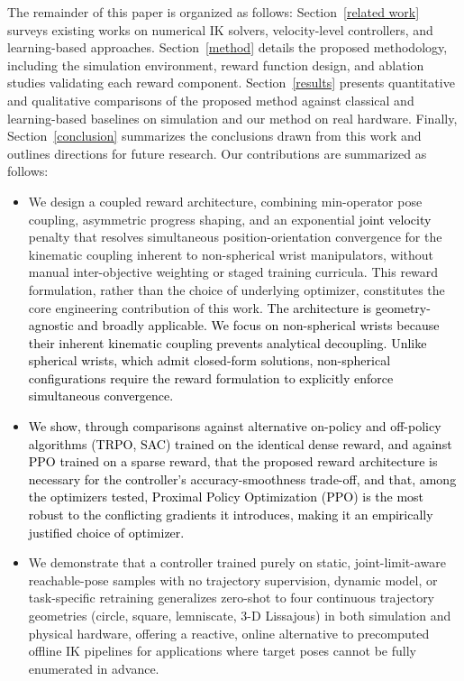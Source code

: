 \documentclass[preprint,12pt]{elsarticle}
\begin{document}
The remainder of this paper is organized as follows: Section~\ref{related work} surveys existing works on numerical IK solvers, velocity-level controllers, and learning-based approaches. Section~\ref{method} details the proposed methodology, including the simulation environment, reward function design, and ablation studies validating each reward component. Section~\ref{results} presents quantitative and qualitative comparisons of the proposed method against classical and learning-based baselines on simulation and our method on real hardware. Finally, Section~\ref{conclusion} summarizes the conclusions drawn from this work and outlines directions for future research. Our contributions are summarized as follows:
\begin{itemize}
\item We design a coupled reward architecture, combining min-operator
pose coupling, asymmetric progress shaping, and an exponential \textcolor{black}{joint velocity}
penalty that resolves simultaneous position-orientation convergence
for the kinematic coupling inherent to non-spherical wrist manipulators,
without manual inter-objective weighting or staged training curricula.
This reward formulation, rather than the choice of underlying optimizer,
constitutes the core engineering contribution of this work. \textcolor{black}{The architecture is geometry-agnostic and broadly applicable. We focus on non-spherical wrists because their inherent kinematic coupling prevents analytical decoupling. Unlike spherical wrists, which admit closed-form solutions, non-spherical configurations require the reward formulation to explicitly enforce simultaneous convergence.}

\item \textcolor{black}{We show, through comparisons against alternative on-policy and off-policy algorithms (TRPO, SAC) trained on the identical dense reward, and against PPO trained on a sparse reward, that the proposed reward architecture is necessary for the controller's accuracy-smoothness trade-off, and that, among the optimizers tested, Proximal Policy Optimization (PPO) is the most robust to the conflicting gradients it introduces, making it an empirically justified choice of optimizer.}



\item We demonstrate that a controller trained purely on static,
joint-limit-aware reachable-pose samples with no trajectory
supervision, dynamic model, or task-specific retraining generalizes
zero-shot to four continuous trajectory geometries (circle, square,
lemniscate, 3-D Lissajous) in both simulation and physical hardware,
offering a reactive, online alternative to precomputed offline IK
pipelines for applications where target poses cannot be fully enumerated
in advance.
\end{itemize}
\end{document}
